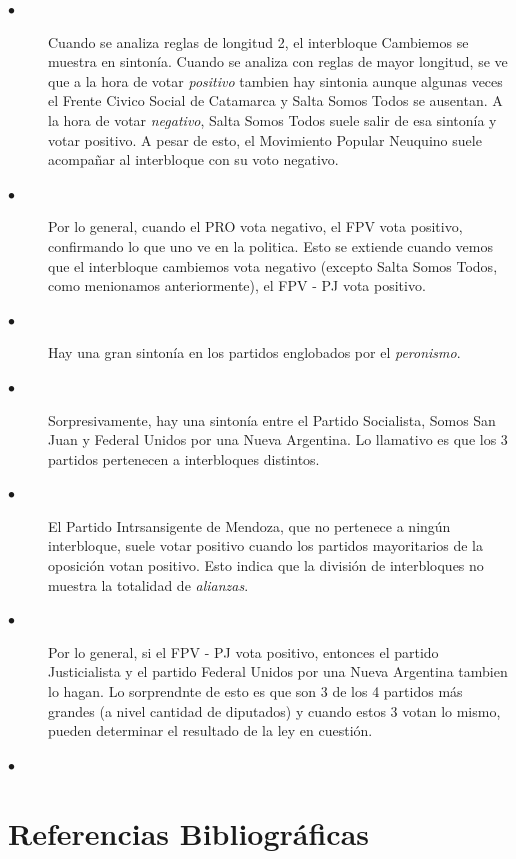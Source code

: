 \documentclass{endm}
\begin{document}
\begin{description}
\item[$\bullet$] Cuando se analiza reglas de longitud 2, el interbloque Cambiemos se muestra en sintonía. Cuando se analiza con reglas de mayor longitud, se ve que a la hora de votar \textit{positivo} tambien hay sintonia aunque algunas veces el Frente Civico Social de Catamarca y Salta Somos Todos se ausentan. A la hora de votar \textit{negativo}, Salta Somos Todos suele salir de esa sintonía y votar positivo. A pesar de esto, el Movimiento Popular Neuquino suele acompañar al interbloque con su voto negativo.

\item[$\bullet$] Por lo general, cuando el PRO vota negativo, el FPV vota positivo, confirmando lo que uno ve en la politica. Esto se extiende cuando vemos que el interbloque cambiemos vota negativo (excepto Salta Somos Todos, como menionamos anteriormente), el FPV - PJ vota positivo.

\item[$\bullet$] Hay una gran sintonía en los partidos englobados por el \textit{peronismo}.

\item[$\bullet$] Sorpresivamente, hay una sintonía entre el Partido Socialista, Somos San Juan y Federal Unidos por una Nueva Argentina. Lo llamativo es que los 3 partidos pertenecen a interbloques distintos.

\item[$\bullet$] El Partido Intrsansigente de Mendoza, que no pertenece a ningún interbloque, suele votar positivo cuando los partidos mayoritarios de la oposición votan positivo. Esto indica que la división de interbloques no muestra la totalidad de \textit{alianzas}.

\item[$\bullet$] Por lo general, si el FPV - PJ vota positivo, entonces el partido Justicialista y el partido Federal Unidos por una Nueva Argentina tambien lo hagan. Lo sorprendnte de esto es que son 3 de los 4 partidos más grandes (a nivel cantidad de diputados) y cuando estos 3 votan lo mismo, pueden determinar el resultado de la ley en cuestión.

\item[$\bullet$]
\end{description}

\section{Referencias Bibliográficas}
\end{document}

